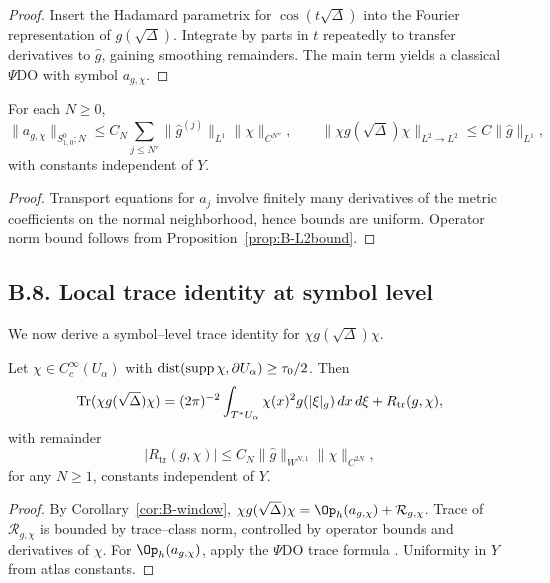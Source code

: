 \begin{proof}
Insert the Hadamard parametrix for $\cos(t\sqrt\Delta)$ into the Fourier representation
of $g(\sqrt\Delta)$. Integrate by parts in $t$ repeatedly to transfer derivatives to $\widehat g$,
gaining smoothing remainders. The main term yields a classical $\Psi$DO with symbol $a_{g,\chi}$.
\end{proof}

\begin{proposition}
\label{prop:B-symbolnorms}
For each $N\ge0$,
\[
\|a_{g,\chi}\|_{S^0_{1,0};N}\le C_N\sum_{j\le N'}\|\widehat g^{(j)}\|_{L^1}\|\chi\|_{C^{N''}},
\qquad
\|\chi g(\sqrt\Delta)\chi\|_{L^2\to L^2}\le C\|\widehat g\|_{L^1},
\]
with constants independent of $Y$.
\end{proposition}

\begin{proof}
Transport equations for $a_j$ involve finitely many derivatives of the metric coefficients
on the normal neighborhood, hence bounds are uniform. Operator norm bound follows from
Proposition~\ref{prop:B-L2bound}.
\end{proof}

\subsection*{B.8. Local trace identity at symbol level}
\label{subsec:B8-trace}

We now derive a symbol–level trace identity for $\chi g(\sqrt\Delta)\chi$.

\begin{theorem}
\label{thm:B-trace}
Let $\chi\in C_c^\infty(U_\alpha)$ with $\operatorname{dist}(\operatorname{supp}\chi,\partial U_\alpha)\ge\tau_0/2$.
Then
\[
\operatorname{Tr}(\chi g(\sqrt\Delta)\chi)
=(2\pi)^{-2}\int_{T^*U_\alpha}\chi(x)^2 g(|\xi|_g)\,dx\,d\xi + R_{\mathrm{tr}}(g,\chi),
\]
with remainder
\[
|R_{\mathrm{tr}}(g,\chi)|\le C_N \|\widehat g\|_{W^{N,1}}\|\chi\|_{C^{2N}},
\]
for any $N\ge1$, constants independent of $Y$.
\end{theorem}

\begin{proof}
By Corollary~\ref{cor:B-window}, $\chi g(\sqrt\Delta)\chi=\Op_h(a_{g,\chi})+\mathcal R_{g,\chi}$.
Trace of $\mathcal R_{g,\chi}$ is bounded by trace–class norm, controlled by operator bounds
and derivatives of $\chi$. For $\Op_h(a_{g,\chi})$, apply the $\Psi$DO trace formula
\cite[Thm.~9.6]{Zworski}. Uniformity in $Y$ from atlas constants.
\end{proof}

